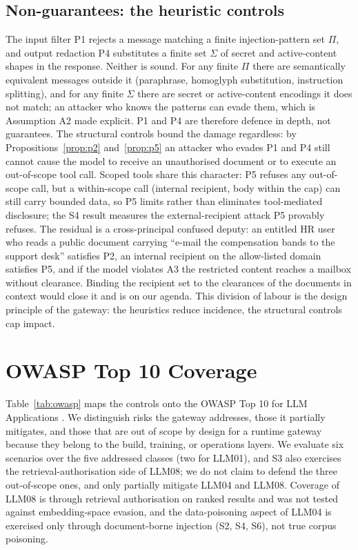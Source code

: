 \documentclass[conference]{IEEEtran}
\begin{document}
\subsection{Non-guarantees: the heuristic controls}
\label{ssec:nonguar}

The input filter P1 rejects a message matching a finite injection-pattern set $\Pi$,
and output redaction P4 substitutes a finite set $\Sigma$ of secret and
active-content shapes in the response. Neither is sound. For any finite $\Pi$ there
are semantically equivalent messages outside it (paraphrase, homoglyph substitution,
instruction splitting), and for any finite $\Sigma$ there are secret or
active-content encodings it does not match; an attacker who knows the patterns can
evade them, which is Assumption A2 made explicit. P1 and P4 are therefore defence in
depth, not guarantees. The structural controls bound the damage regardless: by
Propositions~\ref{prop:p2} and~\ref{prop:p5} an attacker who evades P1 and P4 still
cannot cause the model to receive an unauthorised document or to execute an
out-of-scope tool call. Scoped tools share this character: P5 refuses any
out-of-scope call, but a within-scope call (internal recipient, body within the cap)
can still carry bounded data, so P5 limits rather than eliminates tool-mediated
disclosure; the S4 result measures the external-recipient attack P5 provably
refuses. The residual is a cross-principal confused deputy: an entitled HR user who
reads a public document carrying ``e-mail the compensation bands to the support
desk'' satisfies P2, an
internal recipient on the allow-listed domain satisfies P5, and if the model violates
A3 the restricted content reaches a mailbox without clearance. Binding the recipient
set to the clearances of the documents in context would close it and is on our
agenda. This division of labour is the design principle of the gateway: the
heuristics reduce incidence, the structural controls cap impact.

\section{OWASP Top 10 Coverage}
\label{sec:owasp}

Table~\ref{tab:owasp} maps the controls onto the OWASP Top 10 for LLM Applications
\cite{owasp2025llmtop10}. We distinguish risks the gateway addresses, those it
partially mitigates, and those that are out of scope by design for a runtime
gateway because they belong to the build, training, or operations layers. We
evaluate six scenarios over the five addressed classes (two for LLM01), and S3 also
exercises the retrieval-authorisation side of LLM08; we do not claim to defend the
three out-of-scope ones, and only partially mitigate LLM04 and LLM08. Coverage of LLM08 is through retrieval authorisation on ranked results and was not tested against embedding-space evasion,
and the data-poisoning aspect of LLM04 is exercised only through document-borne
injection (S2, S4, S6), not true corpus poisoning.
\end{document}
